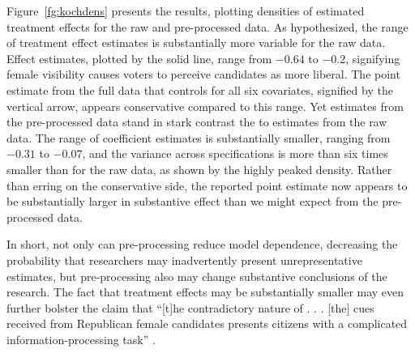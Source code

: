 \documentclass[11pt,letterpaper]{article}
\theoremstyle{plain}
\begin{document}
Figure~\ref{fg:kochdens} presents the results, plotting densities of
estimated treatment effects for the raw and pre-processed data.  As
hypothesized, the range of treatment effect estimates is substantially
more variable for the raw data.  Effect estimates, plotted by the
solid line, range from $-0.64$ to $-0.2$, signifying female visibility
causes voters to perceive candidates as more liberal.  The point
estimate from the full data that controls for all six covariates,
signified by the vertical arrow, appears conservative compared to this
range.  Yet estimates from the pre-processed data stand in stark
contrast the to estimates from the raw data.  The range of coefficient
estimates is substantially smaller, ranging from $-0.31$ to $-0.07$,
and the variance across specifications is more than six times smaller
than for the raw data, as shown by the highly peaked density.  Rather
than erring on the conservative side, the reported point estimate now
appears to be substantially larger in substantive effect than we might
expect from the pre-processed data.

In short, not only can pre-processing reduce model dependence,
decreasing the probability that researchers may inadvertently present
unrepresentative estimates, but pre-processing also may change
substantive conclusions of the research.  The fact that treatment
effects may be substantially smaller may even further bolster the
claim that ``[t]he contradictory nature of . . . [the] cues received
from Republican female candidates presents citizens with a complicated
information-processing task'' \citep[p. 460]{koch:02}.
\end{document}
